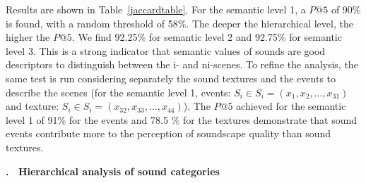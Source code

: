 \documentclass[12pt, titlepage, reqno]{article} %
\renewcommand{\subsection}[1]{\medskip \addtocounter{subsection}{1}\raggedright
    \textbf{\Alph{subsection}. \ #1} \medskip \setcounter{subsubsection}{0}\setlength{\parindent}{5ex}
}
\begin{document}
Results are shown in Table~\ref{jaccardtable}. For the semantic level 1, a $P@5$ of 90\% is found, with a random threshold of 58\%. The deeper the hierarchical level, the higher the $P@5$. We find 92.25\% for semantic level 2 and 92.75\% for semantic level 3. This is a strong indicator that semantic values of sounds are good descriptors to distinguish between the i- and ni-scenes. To refine the analysis, the same test is run considering separately the sound textures and the events to describe the scenes (for the semantic level 1, events: $S_i \in  S_i = (x_1, x_2, \ldots{}, x_{31})$ and texture: $S_i \in  S_i = (x_{32},x_{33}, \ldots{}, x_{44})$). The $P@5$ achieved for the semantic level 1 of 91\% for the events and 78.5 \% for the textures demonstrate that sound events contribute more to the perception of soundscape quality than sound textures.  

\subsection{Hierarchical analysis of sound categories}
\end{document}
